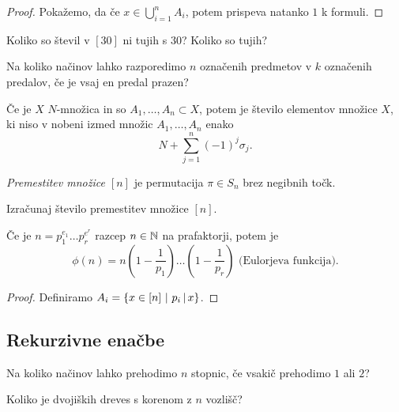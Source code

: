 \begin{proof}
    Pokažemo, da če $x \in \bigcup_{i=1}^n A_i$, potem prispeva natanko $1$ k formuli.
\end{proof}

\begin{primer}
    Koliko so števil v $[30]$ ni tujih s $30$? Koliko so tujih?
\end{primer}

\begin{primer}
    Na koliko načinov lahko razporedimo $n$ označenih predmetov v $k$ označenih predalov, če je vsaj en predal prazen?
\end{primer}

\begin{posledica}
    Če je $X$ $N$-množica in so $A_1, \ldots, A_n \subset X$, potem je število elementov množice $X$, ki niso v nobeni izmed množic $A_1, \ldots, A_n$ enako 
    $$N + \sum_{j=1}^{n}(-1)^j \sigma_j.$$
\end{posledica}

\begin{definicija}
    \emph{Premestitev množice $[n]$} je permutacija $\pi \in S_n$ brez negibnih točk.
\end{definicija}

\begin{primer}
    Izračunaj število premestitev množice $[n]$.
\end{primer}

\begin{izrek}
    Če je $n = p_1^{e_1} \ldots p_r^{e^r}$ razcep $n \in \mathbb{N}$ na prafaktorji, potem je 
    $$\phi(n) = n(1 - \frac{1}{p_1}) \ldots (1 - \frac{1}{p_r}) \text{ (Eulorjeva funkcija)}.$$
\end{izrek}

\begin{proof}
    Definiramo \(A_i = \left\{x \in [n] \ | \ p_i \, | \, x\right\}\).
\end{proof}

\subsection{Rekurzivne enačbe}
\begin{primer} 
    Na koliko načinov lahko prehodimo $n$ stopnic, če vsakič prehodimo $1$ ali $2$?
\end{primer}

\begin{primer}
    Koliko je dvojiških dreves s korenom z $n$ vozlišč?
\end{primer}

